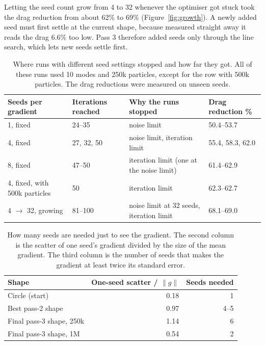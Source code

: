 \documentclass[10pt]{article}
\begin{document}
Letting the seed count grow from 4 to 32 whenever the optimiser got stuck took the drag reduction from about 62\% to 69\% (Figure~\ref{fig:growth}).
A newly added seed must first settle at the current shape, because measured straight away it reads the drag 6.6\% too low.
Pass 3 therefore added seeds only through the line search, which lets new seeds settle first.

\begin{table}[H]
\centering
\small
\caption{\label{tab:seedsrun}Where runs with different seed settings stopped and how far they got. All of these runs used 10 modes and 250k particles, except for the row with 500k particles. The drag reductions were measured on unseen seeds.}
\begin{tabular}{llll}
\toprule
Seeds per gradient & Iterations reached & Why the runs stopped & Drag reduction \% \\
\midrule
1, fixed & 24--35 & noise limit & 50.4--53.7 \\
4, fixed & 27, 32, 50 & noise limit, iteration limit & 55.4, 58.3, 62.0 \\
8, fixed & 47--50 & iteration limit (one at the noise limit) & 61.4--62.9 \\
4, fixed, with 500k particles & 50 & iteration limit & 62.3--62.7 \\
4 $\to$ 32, growing & 81--100 & noise limit at 32 seeds, iteration limit & 68.1--69.0 \\
\bottomrule
\end{tabular}
\par{}
\end{table}

\begin{table}[H]
\centering
\small
\caption{\label{tab:seedsneed}How many seeds are needed just to see the gradient. The second column is the scatter of one seed's gradient divided by the size of the mean gradient. The third column is the number of seeds that makes the gradient at least twice its standard error.}
\begin{tabular}{lrr}
\toprule
Shape & One-seed scatter / $\|g\|$ & Seeds needed \\
\midrule
Circle (start) & 0.18 & 1 \\
Best pass-2 shape & 0.97 & 4--5 \\
Final pass-3 shape, 250k & 1.14 & 6 \\
Final pass-3 shape, 1M & 0.54 & 2 \\
\bottomrule
\end{tabular}
\par{}
\end{table}
\end{document}
